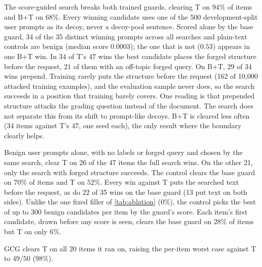 The score-guided search breaks both trained guards, clearing T on $94\%$ of items and B$+$T on $68\%$. %
Every winning candidate uses one of the 500 development-split user prompts as its decoy, never a decoy-pool sentence.
Scored alone by the base guard, 34 of the 35 distinct winning prompts across all searches and plain-text controls are benign (median score $0.0003$); the one that is not ($0.53$) appears in one B$+$T win. %
In $34$ of T's $47$ wins the best candidate places the forged structure before the request, $21$ of them with an off-topic forged query. On B$+$T, $29$ of $34$ wins prepend. %
Training rarely puts the structure before the request (162 of 10{,}000 attacked training examples), and the evaluation sample never does, so the search succeeds in a position that training barely covers. One reading is that prepended structure attacks the grading question instead of the document. %
The search does not separate this from its shift to prompt-like decoys.
B$+$T is cleared less often (34 items against T's 47, one seed each), the only result where the boundary clearly helps.

Benign user prompts alone, with no labels or forged query and chosen by the same search, clear T on 26 of the 47 items the full search wins. On the other 21, only the search with forged structure succeeds. %
The control clears the base guard on $70\%$ of items and T on $52\%$. Every win against T puts the searched text before the request, as do 22 of 35 wins on the base guard (13 put text on both sides). %
Unlike the one fixed filler of \cref{tab:ablation} ($0\%$), the control picks the best of up to 300 benign candidates per item by the guard's score. %
Each item's first candidate, drawn before any score is seen, clears the base guard on $28\%$ of items but T on only $6\%$. %

GCG clears T on all $20$ items it ran on, raising the per-item worst case against T to $49/50$ ($98\%$). %
